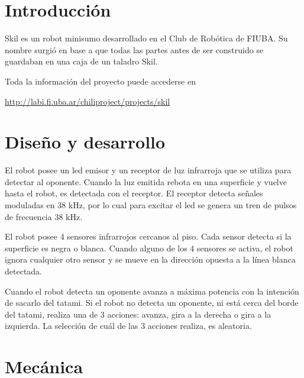 \documentclass[12pt,a4paper]{article}
\begin{document}


\setcounter{secnumdepth}{-1}



\section{Introducción}

Skil es un robot minisumo desarrollado en el Club de Robótica de FIUBA. Su nombre surgió en base a que todas las partes antes de ser construido se guardaban en una caja de un taladro Skil.

Toda la información del proyecto puede accederse en

\url{http://labi.fi.uba.ar/chiliproject/projects/skil}

\section{Diseño y desarrollo}

El robot posee un led emisor y un receptor de luz infrarroja que se utiliza
para detectar al oponente. Cuando la luz emitida rebota en una superficie y
vuelve hasta el robot, es detectada con el receptor.
El receptor detecta
señales moduladas en 38 kHz, por lo cual para excitar el led se genera un tren de pulsos
de frecuencia 38 kHz.

El robot posee 4 sensores infrarrojos cercanos al piso. Cada sensor detecta si la superficie es negra o blanca.
Cuando alguno de los 4 sensores se activa, el robot ignora cualquier otro sensor y se mueve en la dirección opuesta a la línea blanca detectada.

Cuando el robot detecta un oponente avanza a máxima potencia con la intención de sacarlo del tatami.
Si el robot no detecta un oponente, ni está cerca del borde del tatami, realiza una de 3 acciones: avanza, gira a la derecha o gira a la izquierda. La selección de cuál de las 3 acciones realiza, es aleatoria.

\section{Mecánica}
\end{document}
